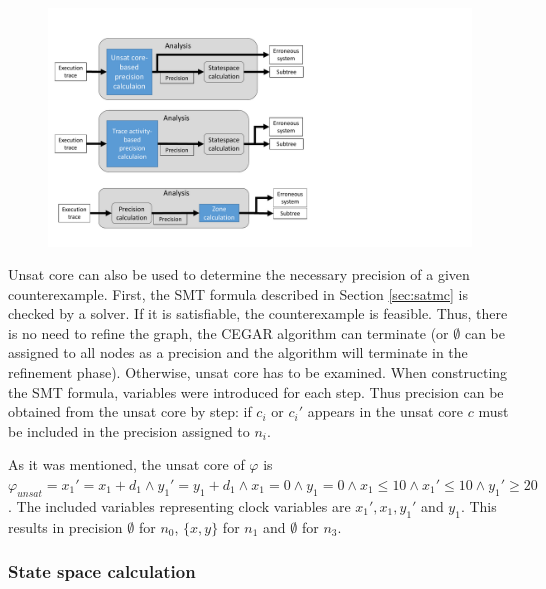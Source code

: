 \begin{figure}[h]
	\centering
	\includegraphics[width=\textwidth]{include/figures/modules_ssp_anal_uncore}
\end{figure}


Unsat core can also be used to determine the necessary precision of a given counterexample. First, the SMT formula described in Section \ref{sec:satmc} is checked by a solver. If it is satisfiable, the counterexample is feasible. Thus, there is no need to refine the graph, the CEGAR algorithm can terminate (or $\emptyset$ can be assigned to all nodes as a precision and the algorithm will terminate in the refinement phase). Otherwise, unsat core has to be examined. When constructing the SMT formula, variables were introduced for each step. Thus precision can be obtained from the unsat core by step: if $c_i$ or $c_i'$ appears in the unsat core $c$ must be included in the precision assigned to $n_i$.

\begin{runningExample}
	As it was mentioned, the unsat core of $\varphi$ is $\varphi_{unsat}=x_1'=x_1+d_1 \wedge y_1'=y_1+d_1 \wedge x_1=0 \wedge y_1=0 \wedge x_1 \leq 10 \wedge x_1' \leq 10 \wedge y_1' \geq 20$. The included variables representing clock variables are $x_1',x_1,y_1'$ and $y_1$. This results in precision $\emptyset$ for $n_0$, $\{x,y\}$ for $n_1$ and $\emptyset$ for $n_3$.
\end{runningExample}

\subsubsection{State space calculation}

